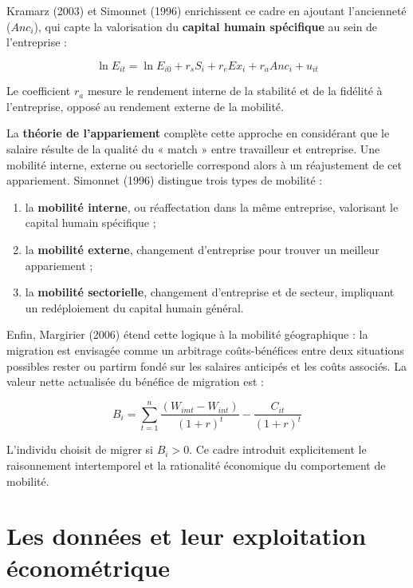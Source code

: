 \documentclass[12pt,a4paper]{article}
\begin{document}
Kramarz (2003) et Simonnet (1996) enrichissent ce cadre en ajoutant l’ancienneté ($Anc_i$), qui capte la valorisation du \textbf{capital humain spécifique} au sein de l’entreprise :

\begin{equation}
\ln E_{it} = \ln E_{i0} + r_s S_i + r_e Ex_i + r_a Anc_i + u_{it}
\end{equation}

Le coefficient $r_a$ mesure le rendement interne de la stabilité et de la fidélité à l’entreprise, opposé au rendement externe de la mobilité.

La \textbf{théorie de l’appariement} complète cette approche en considérant que le salaire résulte de la qualité du « match » entre travailleur et entreprise.  
Une mobilité interne, externe ou sectorielle correspond alors à un réajustement de cet appariement.  
Simonnet (1996) distingue trois types de mobilité :
\begin{enumerate}
    \item la \textbf{mobilité interne}, ou réaffectation dans la même entreprise, valorisant le capital humain spécifique ;
    \item la \textbf{mobilité externe}, changement d’entreprise pour trouver un meilleur appariement ;
    \item la \textbf{mobilité sectorielle}, changement d’entreprise et de secteur, impliquant un redéploiement du capital humain général.
\end{enumerate}

Enfin, Margirier (2006) étend cette logique à la mobilité géographique : la migration est envisagée comme un arbitrage coûts-bénéfices entre deux situations possibles rester ou partirm fondé sur les salaires anticipés et les coûts associés.  
La valeur nette actualisée du bénéfice de migration est :

\begin{equation}
B_i = \sum_{t=1}^{n} \frac{(W_{imt} - W_{int})}{(1 + r)^t} - \frac{C_{it}}{(1 + r)^t}
\end{equation}

L’individu choisit de migrer si $B_i > 0$. Ce cadre introduit explicitement le raisonnement intertemporel et la rationalité économique du comportement de mobilité.

\section{Les données et leur exploitation économétrique}
\end{document}
